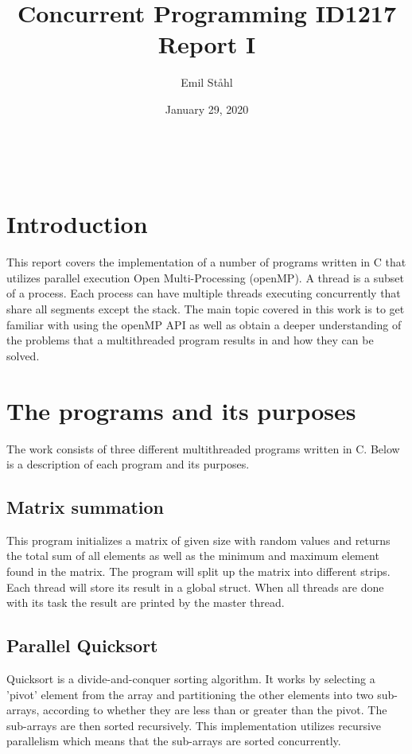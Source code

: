 \documentclass{article}
\title{\textbf{Concurrent Programming ID1217} \\ 
\textbf{Report I}}
\author{Emil Ståhl}
\date{January 29, 2020}
\begin{document}
\maketitle

\section{Introduction}

This report covers the implementation of a number of programs written in C that utilizes parallel execution Open Multi-Processing (openMP). A thread is a subset of a process. Each process can have multiple threads executing concurrently that share all segments except the stack. The main topic covered in this work is to get familiar with using the openMP API as well as obtain a deeper understanding of the problems that a multithreaded program results in and how they can be solved. 

\section{The programs and its purposes}

The work consists of three different multithreaded programs written in C. Below is a description of each program and its purposes.  

\subsection{Matrix summation}

This program initializes a matrix of given size with random values and returns the total sum of all elements as well as the minimum and maximum element found in the matrix. The program will split up the matrix into different strips. Each thread will store its result in a global struct. When all threads are done with its task the result are printed by the master thread. 

\subsection{Parallel Quicksort}

Quicksort is a divide-and-conquer sorting algorithm. It works by selecting a 'pivot' element from the array and partitioning the other elements into two sub-arrays, according to whether they are less than or greater than the pivot. The sub-arrays are then sorted recursively. This implementation utilizes recursive parallelism which means that the sub-arrays are sorted concurrently. 
\end{document}

